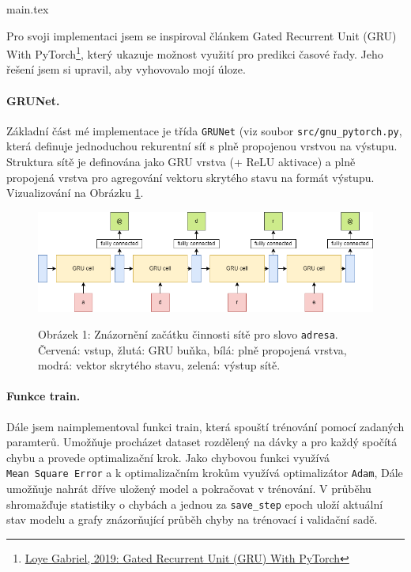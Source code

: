 main.tex\documentclass[a4paper]{article}
\theoremstyle{definition}
\begin{document}
Pro svoji implementaci jsem se inspiroval článkem Gated Recurrent Unit (GRU) With PyTorch\footnote{\href{https://blog.floydhub.com/gru-with-pytorch/}{Loye Gabriel, 2019: Gated Recurrent Unit (GRU) With PyTorch}}, který ukazuje možnost využití pro predikci časové řady. Jeho řešení jsem si upravil, aby vyhovovalo mojí úloze.

\paragraph{GRUNet.}
Základní část mé implementace je třída \texttt{GRUNet} (viz soubor \texttt{src/gnu\_pytorch.py}, která definuje jednoduchou rekurentní síť s plně propojenou vrstvou na výstupu. Struktura sítě je definována jako GRU vrstva (+ ReLU aktivace) a plně propojená vrstva pro agregování vektoru skrytého stavu na formát výstupu. Vizualizování na Obrázku \ref{png:gru_adresa}.

\begin{figure}[t!]
  \centering
  \includegraphics[width=4.5in]{gru_diagram_adresa.png}\\[1pt]  %
  \caption{Obrázek 1: Znázornění začátku činnosti sítě pro slovo \texttt{adresa}.\\Červená: vstup, žlutá: GRU buňka, bílá: plně propojená vrstva, modrá: vektor skrytého stavu, zelená: výstup sítě.}
  \label{png:gru_adresa}
\end{figure}

\paragraph{Funkce train.}
Dále jsem naimplementoval funkci train, která spouští trénování pomocí zadaných paramterů. Umožňuje procházet dataset rozdělený na dávky a pro každý spočítá chybu a provede optimalizační krok. Jako chybovou funkci využívá \texttt{Mean\ Square\ Error} a k optimalizačním krokům využívá optimalizátor \texttt{Adam}, Dále umožňuje nahrát dříve uložený model a pokračovat v trénování. V průběhu shromažďuje statistiky o chybách a jednou za \texttt{save\_step} epoch uloží aktuální stav modelu a grafy znázorňující průběh chyby na trénovací i validační sadě.
\end{document}
